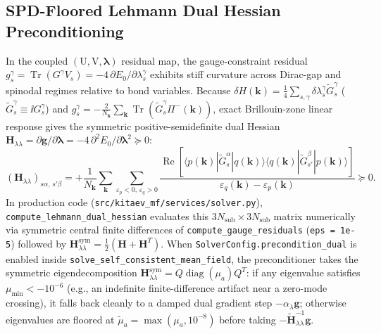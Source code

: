 \subsection{SPD-Floored Lehmann Dual Hessian Preconditioning}
In the coupled $(\mathrm{U}, \mathrm{V}, \boldsymbol{\lambda})$ residual map, the gauge-constraint residual $g_s^\gamma = \operatorname{Tr}(G^\gamma V_s) = -4\,\partial E_0 / \partial \lambda_s^\gamma$ exhibits stiff curvature across Dirac-gap and spinodal regimes relative to bond variables. Because $\delta H(\mathbf{k}) = \frac{1}{4}\sum_{s,\gamma} \delta\lambda_s^\gamma \tilde{G}_s^\gamma$ ($\tilde{G}_s^\gamma \equiv \ii G_s^\gamma$) and $g_s^\gamma = -\frac{2}{N_{\mathbf{k}}}\sum_{\mathbf{k}} \operatorname{Tr}(\tilde{G}_s^\gamma \Pi^-(\mathbf{k}))$, exact Brillouin-zone linear response gives the symmetric positive-semidefinite dual Hessian $\mathbf{H}_{\lambda\lambda} = \partial \mathbf{g}/\partial \boldsymbol{\lambda} = -4\,\partial^2 E_0/\partial \boldsymbol{\lambda}^2 \succeq 0$:
\begin{equation}
\label{eq:m1_6_lehmann_hessian}
(\mathbf{H}_{\lambda\lambda})_{s\alpha,\, s'\beta} = +\frac{1}{N_{\mathbf{k}}} \sum_{\mathbf{k}} \sum_{\varepsilon_p < 0,\, \varepsilon_q > 0} \frac{\operatorname{Re}\!\left[ \langle p(\mathbf{k}) | \tilde{G}_s^\alpha | q(\mathbf{k}) \rangle \langle q(\mathbf{k}) | \tilde{G}_{s'}^\beta | p(\mathbf{k}) \rangle \right]}{\varepsilon_q(\mathbf{k}) - \varepsilon_p(\mathbf{k})} \succeq 0.
\end{equation}
In production code (\texttt{src/kitaev\_mf/services/solver.py}), \texttt{compute\_lehmann\_dual\_hessian} evaluates this $3N_{\mathrm{sub}} \times 3N_{\mathrm{sub}}$ matrix numerically via symmetric central finite differences of \texttt{compute\_gauge\_residuals} (\texttt{eps = 1e-5}) followed by $\mathbf{H}_{\lambda\lambda}^{\mathrm{sym}} = \frac{1}{2}(\mathbf{H} + \mathbf{H}^T)$. When \texttt{SolverConfig.precondition\_dual} is enabled inside \texttt{solve\_self\_consistent\_mean\_field}, the preconditioner takes the symmetric eigendecomposition $\mathbf{H}_{\lambda\lambda}^{\mathrm{sym}} = Q \operatorname{diag}(\mu_a) Q^T$: if any eigenvalue satisfies $\mu_{\min} < -10^{-6}$ (e.g., an indefinite finite-difference artifact near a zero-mode crossing), it falls back cleanly to a damped dual gradient step $-\alpha_\lambda \mathbf{g}$; otherwise eigenvalues are floored at $\tilde{\mu}_a = \max(\mu_a, 10^{-8})$ before taking $-\tilde{\mathbf{H}}_{\lambda\lambda}^{-1} \mathbf{g}$.

